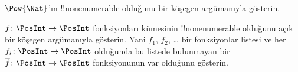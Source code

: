 \documentclass[../../../include/open-logic-section]{subfiles}
\begin{document}
\begin{prob}
$\Pow{\Nat}$'ın !!{nonenumerable} olduğunu bir köşegen argümanıyla gösterin.
\end{prob}

\begin{prob}\label{sfr:siz:nen:prob:f-posint}
$f\colon\PosInt\to\PosInt$ fonksiyonları kümesinin !!{nonenumerable}
olduğunu açık bir köşegen argümanıyla gösterin. Yani $f_1$, $f_2$, \dots{}
bir fonksiyonlar listesi ve her $f_i\colon\PosInt\to\PosInt$ olduğunda bu
listede bulunmayan bir $\overline{f}\colon\PosInt\to\PosInt$ fonksiyonunun
var olduğunu gösterin.
\end{prob}
\end{document}
